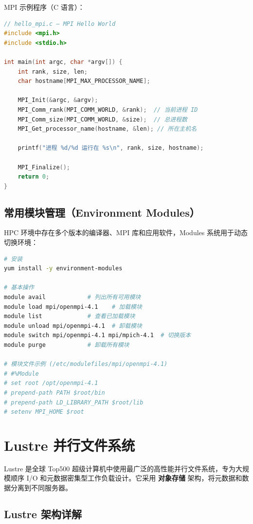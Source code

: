 \documentclass[12pt,UTF8]{ctexbook}
\begin{document}
MPI 示例程序（C 语言）：

\begin{lstlisting}[language=c]
// hello_mpi.c — MPI Hello World
#include <mpi.h>
#include <stdio.h>

int main(int argc, char *argv[]) {
    int rank, size, len;
    char hostname[MPI_MAX_PROCESSOR_NAME];

    MPI_Init(&argc, &argv);
    MPI_Comm_rank(MPI_COMM_WORLD, &rank);  // 当前进程 ID
    MPI_Comm_size(MPI_COMM_WORLD, &size);  // 总进程数
    MPI_Get_processor_name(hostname, &len); // 所在主机名

    printf("进程 %d/%d 运行在 %s\n", rank, size, hostname);

    MPI_Finalize();
    return 0;
}
\end{lstlisting}

\subsection{常用模块管理（Environment Modules）}

HPC 环境中存在多个版本的编译器、MPI 库和应用软件，Modules 系统用于动态切换环境：

\begin{lstlisting}[language=bash]
# 安装
yum install -y environment-modules

# 基本操作
module avail            # 列出所有可用模块
module load mpi/openmpi-4.1    # 加载模块
module list             # 查看已加载模块
module unload mpi/openmpi-4.1  # 卸载模块
module switch mpi/openmpi-4.1 mpi/mpich-4.1  # 切换版本
module purge            # 卸载所有模块

# 模块文件示例 (/etc/modulefiles/mpi/openmpi-4.1)
# #%Module
# set root /opt/openmpi-4.1
# prepend-path PATH $root/bin
# prepend-path LD_LIBRARY_PATH $root/lib
# setenv MPI_HOME $root
\end{lstlisting}

\section{Lustre 并行文件系统}
\label{sec:lustre}

Lustre 是全球 Top500 超级计算机中使用最广泛的高性能并行文件系统，专为大规模顺序 I/O 和元数据密集型工作负载设计。它采用 \textbf{对象存储} 架构，将元数据和数据分离到不同服务器。

\subsection{Lustre 架构详解}
\end{document}
